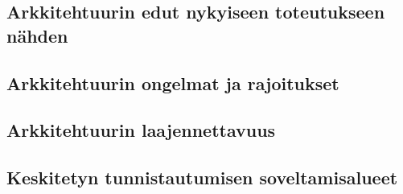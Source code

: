 

\subsection{Arkkitehtuurin edut nykyiseen toteutukseen nähden}


\subsection{Arkkitehtuurin ongelmat ja rajoitukset}


\subsection{Arkkitehtuurin laajennettavuus}


\subsection{Keskitetyn tunnistautumisen soveltamisalueet}
